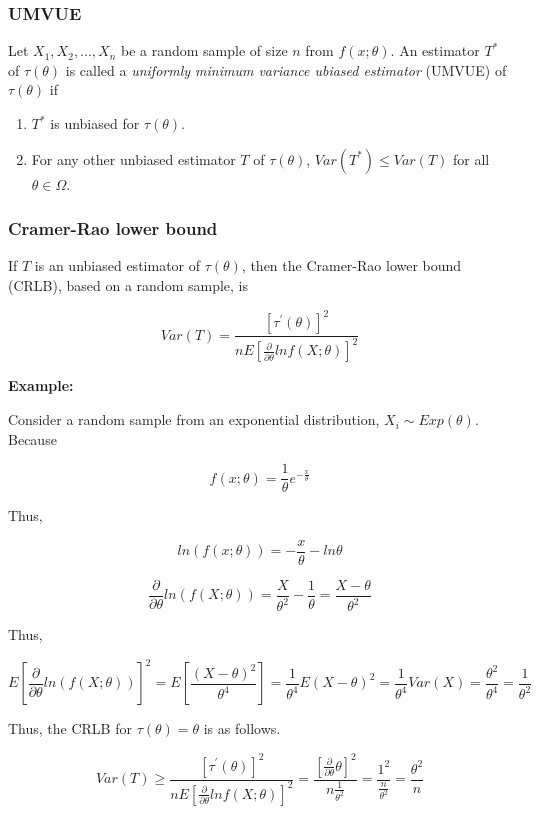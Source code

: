 \documentclass[]{book}
\begin{document}
\hypertarget{umvue}{%
\subsubsection{UMVUE}\label{umvue}}

Let \(X_1, X_2,...,X_n\) be a random sample of size \(n\) from \(f(x; \theta)\). An estimator \(T^*\) of \(\tau (\theta)\) is called a \emph{uniformly minimum variance ubiased estimator} (UMVUE) of \(\tau(\theta)\) if

\begin{enumerate}
\def\labelenumi{\arabic{enumi}.}
\item
  \(T^*\) is unbiased for \(\tau (\theta)\).
\item
  For any other unbiased estimator \(T\) of \(\tau(\theta)\), \(Var(T^*) \leq Var(T)\) for all \(\theta \in \Omega\).
\end{enumerate}

\hypertarget{cramer-rao-lower-bound}{%
\subsubsection{Cramer-Rao lower bound}\label{cramer-rao-lower-bound}}

If \(T\) is an unbiased estimator of \(\tau(\theta)\), then the Cramer-Rao lower bound (CRLB), based on a random sample, is

\[Var(T)=\frac{[\tau^{'}(\theta)]^2}{nE[\frac{\partial}{\partial \theta} ln f(X; \theta)]^2}\]

\textbf{Example:}

Consider a random sample from an exponential distribution, \(X_i \sim Exp(\theta)\). Because

\[f(x; \theta)=\frac{1}{\theta} e^{-\frac{x}{\theta}}\]

Thus,

\[ln(f(x;\theta))=-\frac{x}{\theta}-ln \theta\]

\[\frac{\partial}{\partial \theta} ln(f(X; \theta))=\frac{X}{\theta^2}-\frac{1}{\theta}=\frac{X-\theta}{\theta^2}\]

Thus,

\[E[\frac{\partial}{\partial \theta} ln(f(X; \theta))]^2 =E[\frac{(X-\theta)^2}{\theta^4}]=\frac{1}{\theta^4}E(X-\theta)^2=\frac{1}{\theta^4} Var(X)=\frac{\theta^2}{\theta^4}=\frac{1}{\theta^2}\]

Thus, the CRLB for \(\tau(\theta)=\theta\) is as follows.

\[Var(T) \geq \frac{[\tau^{'}(\theta)]^2}{nE[\frac{\partial}{\partial \theta} ln f(X; \theta)]^2}=\frac{[\frac{\partial }{\partial \theta}\theta]^2}{n \frac{1}{\theta^2}}=\frac{1^2}{\frac{n}{\theta^2}}=\frac{\theta^2}{n}\]
\end{document}
